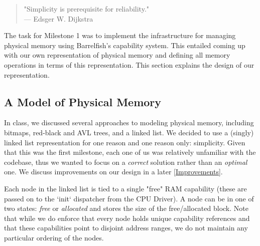 

\lstset{
    language=C
}

\begin{quote}
"Simplicity is prerequisite for reliability." \\
\hspace*{\fill} — Edsger W. Dijkstra
\end{quote}

The task for Milestone 1 was to implement the infrastructure for managing physical memory using Barrelfish's capability system. This entailed coming up with our own representation of physical memory and defining all memory operations in terms of this representation. This section explains the design of our representation.

\subsection*{A Model of Physical Memory}
In class, we discussed several approaches to modeling physical memory, including bitmaps, red-black and AVL trees, and a linked list. We decided to use a (singly) linked list representation for one reason and one reason only: simplicity. Given that this was the first milestone, each one of us was relatively unfamiliar with the codebase, thus we wanted to focus on a \textit{correct} solution rather than an \textit{optimal} one. We discuss improvements on our design in a later \autoref{Improvements}.

Each node in the linked list is tied to a single "free" RAM capability (these are passed on to the `init` dispatcher from the CPU Driver). A node can be in one of two states: \textit{free} or \textit{allocated} and stores the size of the free/allocated block. Note that while we do enforce that every node holds unique capability references and that these capabilities point to disjoint address ranges, we do not maintain any particular ordering of the nodes. 




